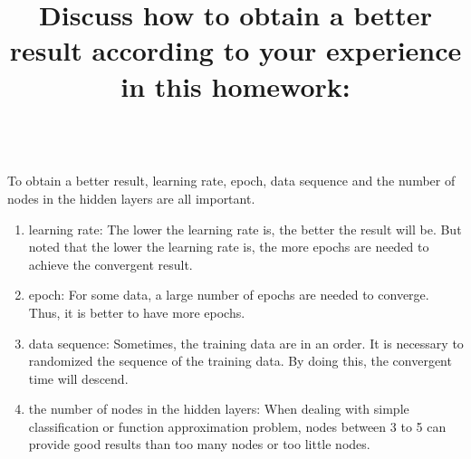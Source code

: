 \documentclass[12pt,a4paper]{article}
\begin{document}
\begin{CJK}{UTF8}{bsmi}
\begin{enumerate}
	\end{enumerate}
\newpage
\title{\large \bf Discuss how to obtain a better result according to your experience in this homework:}
\\
To obtain a better result, learning rate, epoch, data sequence and the  number of nodes in the hidden layers are all important.
\begin{enumerate}
	\item learning rate: The lower the learning rate is, the better the result will be. But noted that the lower the learning rate is, the more epochs are needed to achieve the convergent result.
	\item epoch: For some data, a large number of epochs are needed to converge. Thus, it is better to have more epochs.
	\item data sequence: Sometimes, the training data are in an order. It is necessary to randomized the sequence of the training data. By doing this, the convergent time will descend.
	\item the number of nodes in the hidden layers: When dealing with simple classification or function approximation problem, nodes between 3 to 5 can provide good results than too many nodes or too little nodes.
\end{enumerate}
\end{CJK}
\end{document}
